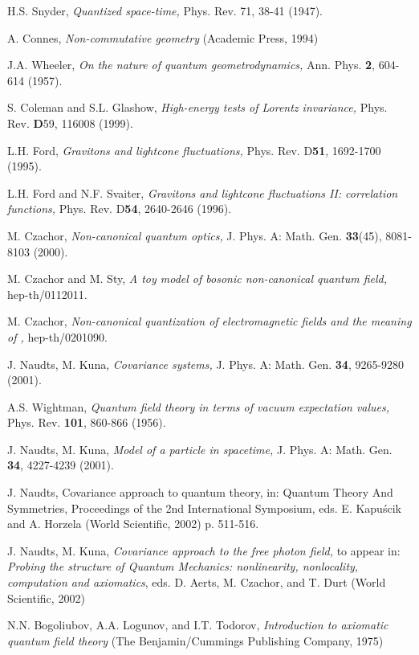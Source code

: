 \documentclass[12pt,a4paper]{article}
\begin{document}
\begin{thebibliography}{99}

\parskip 2pt

 H.S. Snyder, {\sl Quantized space-time,} Phys. Rev. 71, 38-41 (1947).

 A. Connes, {\sl Non-commutative geometry}
(Academic Press, 1994)

 J.A. Wheeler, {\sl On the nature of quantum geometrodynamics,}
Ann. Phys. {\bf 2}, 604-614 (1957).

 S. Coleman and S.L. Glashow, {\sl High-energy tests of Lorentz
invariance,} Phys. Rev. {\bf D}59, 116008 (1999).

 L.H. Ford, {\sl Gravitons and lightcone fluctuations,} 
Phys. Rev. D{\bf 51}, 1692-1700 (1995).

  L.H. Ford and N.F. Svaiter, {\sl Gravitons and
lightcone fluctuations II: correlation functions,}
Phys. Rev. D{\bf 54}, 2640-2646 (1996).

 M. Czachor, {\sl Non-canonical quantum optics,}
J. Phys. A: Math. Gen. {\bf 33}(45), 8081-8103 (2000).

 M. Czachor and M. Sty, {\sl A toy model of bosonic
non-canonical quantum field,} hep-th/0112011.

 M. Czachor, {\sl Non-canonical quantization of
electromagnetic fields and the meaning of \coordHE{},}
hep-th/0201090.

 J. Naudts, M. Kuna, {\sl Covariance systems,} J. 
Phys. A: Math. Gen. {\bf 34}, 9265-9280 (2001).

 A.S. Wightman, {\sl Quantum field theory in terms of vacuum
expectation values,} Phys. Rev. {\bf 101}, 860-866 (1956).

 J. Naudts, M. Kuna, {\sl Model of a particle in
spacetime,} J. Phys. A: Math. Gen. {\bf 34}, 4227-4239 (2001).

 J. Naudts, Covariance approach to quantum theory,
in: Quantum Theory And Symmetries, Proceedings of the 2nd International Symposium,
eds. E. Kapu\'scik and A. Horzela (World Scientific, 2002) p. 511-516.

 J. Naudts, M. Kuna,
{\sl Covariance approach to the free photon field,}
to appear in: {\sl Probing the structure of Quantum
Mechanics: nonlinearity, nonlocality, computation and axiomatics},
eds. D. Aerts, M. Czachor, and T. Durt (World Scientific, 2002)

 N.N. Bogoliubov, A.A. Logunov, and I.T. Todorov,
{\sl Introduction to axiomatic quantum field theory}
(The Benjamin/Cummings Publishing Company, 1975)


\end{thebibliography}
\end{document}
